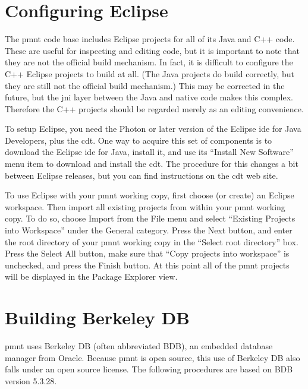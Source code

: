\section{Configuring Eclipse}

The \ac{pmnt} code base includes Eclipse projects for all of its Java and C++ code.  These are useful for inspecting and editing code, but it is important to note that they are not the official build mechanism.  In fact, it is difficult to configure the C++ Eclipse projects to build at all.  (The Java projects do build correctly, but they are still not the official build mechanism.)  This may be corrected in the future, but the \ac{jni} layer between the Java and native code makes this complex.  Therefore the C++ projects should be regarded merely as an editing convenience.

To setup Eclipse, you need the Photon or later version of the Eclipse \ac{ide} for Java Developers, plus the \ac{cdt}.  One way to acquire this set of components is to download the Eclipse \ac{ide} for Java, install it, and use its ``Install New Software'' menu item to download and install the \ac{cdt}.  The procedure for this changes a bit between Eclipse releases, but you can find instructions on the \ac{cdt} web site.

To use Eclipse with your \ac{pmnt} working copy, first choose (or create) an Eclipse workspace.  Then import all existing projects from within your \ac{pmnt} working copy.  To do so, choose Import from the File menu and select ``Existing Projects into Workspace'' under the General category.  Press the Next button, and enter the root directory of your \ac{pmnt} working copy in the ``Select root directory'' box.  Press the Select All button, make sure that ``Copy projects into workspace'' is unchecked, and press the Finish button.  At this point all of the \ac{pmnt} projects will be displayed in the Package Explorer view.

\section{Building Berkeley DB}
\label{sec:BuildingBerkeleyDB}

\ac{pmnt} uses Berkeley DB (often abbreviated BDB), an embedded database manager from Oracle.  Because \ac{pmnt} is open source, this use of Berkeley DB also falls under an open source license.  The following procedures are based on BDB version 5.3.28.

